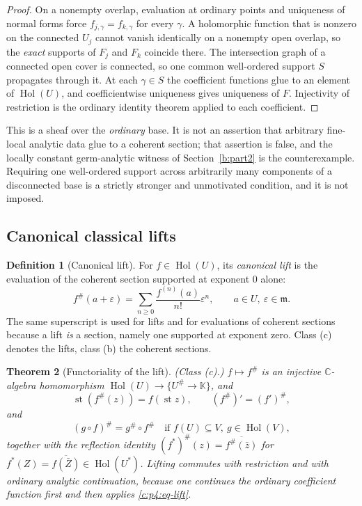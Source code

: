 \documentclass[11pt,a4paper]{article}
\numberwithin{equation}{section}
\newtheorem{theorem}{Theorem}[section]
\theoremstyle{definition}
\newtheorem{definition}[theorem]{Definition}
\theoremstyle{remark}
\theoremstyle{plain}
\newcommand{\K}{\mathbb K}
\newcommand{\CC}{\mathbb C}
\newcommand{\mm}{\mathfrak m}
\DeclareMathOperator{\Hol}{Hol}
\DeclareMathOperator{\st}{st}
\newcommand{\halo}[1]{#1^{\#}}
\newcommand{\ev}[1]{#1^{\#}}
\begin{document}
\begin{proof}
On a nonempty overlap, evaluation at ordinary points and uniqueness of
normal forms force $f_{j,\gamma}=f_{k,\gamma}$ for every $\gamma$. A
holomorphic function that is nonzero on the connected $U_j$ cannot
vanish identically on a nonempty open overlap, so the \emph{exact}
supports of $F_j$ and $F_k$ coincide there. The intersection graph of a
connected open cover is connected, so one common well-ordered support
$S$ propagates through it. At each $\gamma\in S$ the coefficient
functions glue to an element of $\Hol(U)$, and coefficientwise
uniqueness gives uniqueness of $F$. Injectivity of restriction is the
ordinary identity theorem applied to each coefficient.
\end{proof}

This is a sheaf over the \emph{ordinary} base. It is not an assertion
that arbitrary fine-local analytic data glue to a coherent section; that
assertion is false, and the locally constant germ-analytic witness of Section~\ref{b:part2} is the counterexample.
Requiring one well-ordered support across arbitrarily many components of
a disconnected base is a strictly stronger and unmotivated condition,
and it is not imposed.

\subsection{Canonical classical lifts}
\label{c:p4:lifts}

\begin{definition}[Canonical lift]\label{c:p4:def-lift}
For $f\in\Hol(U)$, its \emph{canonical lift} is the evaluation of the
coherent section supported at exponent $0$ alone:
\begin{equation}\label{c:p4:eq-lift}
 \ev f(a+\varepsilon)=\sum_{n\ge0}\frac{f^{(n)}(a)}{n!}\varepsilon^{n},
 \qquad a\in U,\ \varepsilon\in\mm .
\end{equation}
The same superscript is used for lifts and for evaluations of coherent
sections because a lift \emph{is} a section, namely one supported at
exponent zero. Class (c) denotes the lifts, class (b) the coherent
sections.
\end{definition}

\begin{theorem}[Functoriality of the lift]\label{c:p4:lift}
\emph{(Class (c).)} $f\mapsto\ev f$ is an injective
$\CC$-algebra homomorphism $\Hol(U)\to\{\halo U\to\K\}$, and
\[
 \st(\ev f(z))=f(\st z),\qquad (\ev f)'=\ev{(f')},
\]
and
\[
 \ev{(g\circ f)}=\ev g\circ\ev f
 \quad\text{if }f(U)\subseteq V,\ g\in\Hol(V),
\]
together with the reflection identity
$\ev{(f^{*})}(z)=\overline{\ev f(\bar z)}$ for
$f^{*}(Z)=\overline{f(\bar Z)}\in\Hol(U^{*})$. Lifting commutes with
restriction and with ordinary analytic continuation, because one
continues the ordinary coefficient function first and then applies
\eqref{c:p4:eq-lift}.
\end{theorem}
\end{document}
